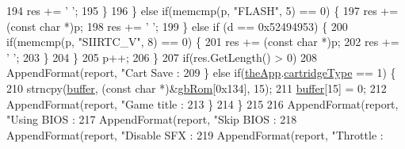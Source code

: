 \begin{DoxyCode}
{{{{{{194             res += \textcolor{charliteral}{' '};
195           \}
196         \} \textcolor{keywordflow}{else} \textcolor{keywordflow}{if}(memcmp(p, \textcolor{stringliteral}{"FLASH"}, 5) == 0) \{
197           res += (\textcolor{keyword}{const} \textcolor{keywordtype}{char} *)p;
198           res += \textcolor{charliteral}{' '};
199         \} \textcolor{keywordflow}{else} \textcolor{keywordflow}{if} (d == 0x52494953) \{
200           \textcolor{keywordflow}{if}(memcmp(p, \textcolor{stringliteral}{"SIIRTC\_V"}, 8) == 0) \{
201             res += (\textcolor{keyword}{const} \textcolor{keywordtype}{char} *)p;
202             res += \textcolor{charliteral}{' '};
203           \}
204         \}
205         p++;
206       \}
207       \textcolor{keywordflow}{if}(res.GetLength() > 0)
208         AppendFormat(report, \textcolor{stringliteral}{"Cart Save    : %
209     \} \textcolor{keywordflow}{else} \textcolor{keywordflow}{if}(\mbox{\hyperlink{_v_b_a_8cpp_a8095a9d06b37a7efe3723f3218ad8fb3}{theApp}}.\mbox{\hyperlink{class_v_b_a_af300759fcbc7eeb00ce73f956fc5ddb7}{cartridgeType}} == 1) \{
210       strncpy(\mbox{\hyperlink{_g_b_a_8cpp_a28d4d3d8445e73a696b2d6f7eadabd96}{buffer}}, (\textcolor{keyword}{const} \textcolor{keywordtype}{char} *)&\mbox{\hyperlink{gb_globals_8cpp_ae4f6bd8162474dbcfdbc54c36d7f5695}{gbRom}}[0x134], 15);
211       \mbox{\hyperlink{_g_b_a_8cpp_a28d4d3d8445e73a696b2d6f7eadabd96}{buffer}}[15] = 0;
212       AppendFormat(report, \textcolor{stringliteral}{"Game title   : %
213     \}
214   \}
215   
216   AppendFormat(report, \textcolor{stringliteral}{"Using BIOS   : %
217   AppendFormat(report, \textcolor{stringliteral}{"Skip BIOS    : %
218   AppendFormat(report, \textcolor{stringliteral}{"Disable SFX  : %
219   AppendFormat(report, \textcolor{stringliteral}{"Throttle     : %
}}}}}}}}}}}}
\end{DoxyCode}
